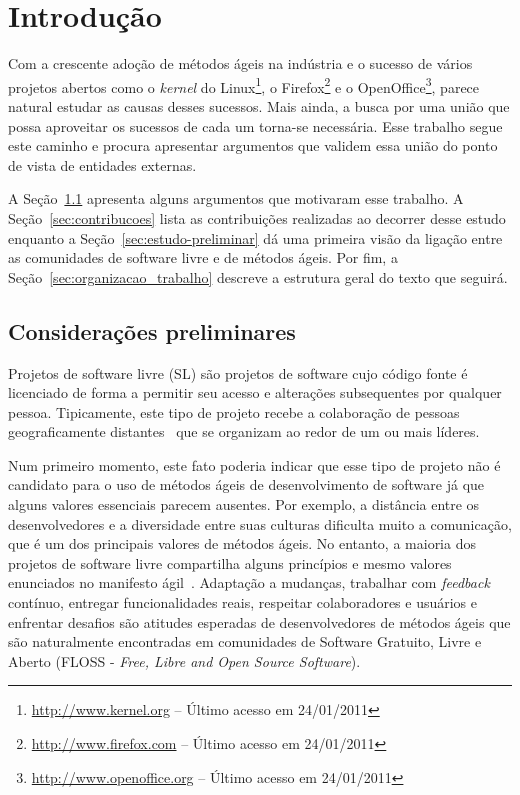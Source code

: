 \chapter{Introdução}
\label{cap:introducao}

Com a crescente adoção de métodos ágeis na indústria e o sucesso de
vários projetos abertos como o \textit{kernel} do
Linux\footnote{\url{http://www.kernel.org} -- Último acesso em
  24/01/2011}, o Firefox\footnote{\url{http://www.firefox.com} --
  Último acesso em 24/01/2011} e o
OpenOffice\footnote{\url{http://www.openoffice.org} -- Último acesso
  em 24/01/2011}, parece natural estudar as causas desses
sucessos. Mais ainda, a busca por uma união que possa aproveitar os
sucessos de cada um torna-se necessária. Esse trabalho segue este
caminho e procura apresentar argumentos que validem essa união do
ponto de vista de entidades externas.

A Seção~\ref{sec:consideracoes_preliminares} apresenta alguns
argumentos que motivaram esse trabalho. A
Seção~\ref{sec:contribucoes} lista as contribuições realizadas ao
decorrer desse estudo enquanto a Seção~\ref{sec:estudo-preliminar} dá
uma primeira visão da ligação entre as comunidades de software livre e
de métodos ágeis. Por fim, a Seção~\ref{sec:organizacao_trabalho}
descreve a estrutura geral do texto que seguirá.

\section{Considerações preliminares}
\label{sec:consideracoes_preliminares}

Projetos de software livre (SL) são projetos de software cujo código
fonte é licenciado de forma a permitir seu acesso e alterações
subsequentes por qualquer pessoa. Tipicamente, este tipo de projeto
recebe a colaboração de pessoas geograficamente
distantes~\cite{Dempsey1999} que se organizam ao redor de um ou mais
líderes.

Num primeiro momento, este fato poderia indicar que esse tipo de
projeto não é candidato para o uso de métodos ágeis de desenvolvimento
de software já que alguns valores essenciais parecem ausentes. Por
exemplo, a distância entre os desenvolvedores e a diversidade entre
suas culturas dificulta muito a comunicação, que é um dos principais
valores de métodos ágeis. No entanto, a maioria dos projetos de
software livre compartilha alguns princípios e mesmo valores
enunciados no manifesto ágil~\cite{AgileManifesto}. Adaptação a
mudanças, trabalhar com \emph{feedback} contínuo, entregar
funcionalidades reais, respeitar colaboradores e usuários e enfrentar
desafios são atitudes esperadas de desenvolvedores de métodos ágeis
que são naturalmente encontradas em comunidades de Software Gratuito,
Livre e Aberto (FLOSS - \emph{Free, Libre and Open Source Software}).

